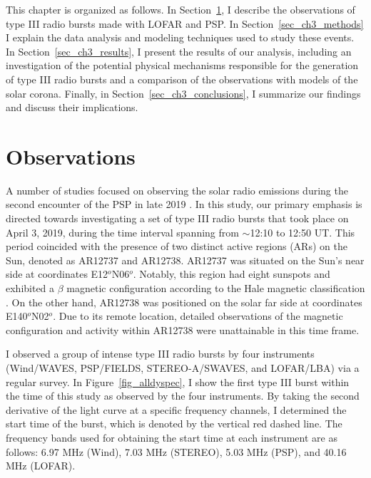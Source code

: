 This chapter is organized as follows. In Section~\ref{sec_ch3_obs}, I describe the observations of type III radio bursts made with LOFAR and PSP. In Section~\ref{sec_ch3_methods} I explain the data analysis and modeling techniques used to study these events. In Section~\ref{sec_ch3_results}, I present the results of our analysis, including an investigation of the potential physical mechanisms responsible for the generation of type III radio bursts and a comparison of the observations with models of the solar corona. Finally, in Section~\ref{sec_ch3_conclusions}, I summarize our findings and discuss their implications.

\section{Observations}
\label{sec_ch3_obs}
A number of studies focused on observing the solar radio emissions during the second encounter of the PSP in late 2019 \cite{krupar_2020, pulupa_2020, cattell_2021, harra_2021, badman_2022}. In this study, our primary emphasis is directed towards investigating a set of type III radio bursts that took place on April 3, 2019, during the time interval spanning from $\sim$12:10 to 12:50 UT. This period coincided with the presence of two distinct active regions (ARs) on the Sun, denoted as AR12737 and AR12738. 
AR12737 was situated on the Sun's near side at coordinates E12$^o$N06$^o$. Notably, this region had eight sunspots and exhibited a $\beta$ magnetic configuration according to the Hale magnetic classification \cite{hale_2019}. On the other hand, AR12738 was positioned on the solar far side at coordinates E140$^o$N02$^o$. Due to its remote location, detailed observations of the magnetic configuration and activity within AR12738 were unattainable in this time frame.

I observed a group of intense type III radio bursts by four instruments (Wind/WAVES, PSP/FIELDS, STEREO-A/SWAVES, and LOFAR/LBA) via a regular survey. In Figure~\ref{fig_alldyspec}, I show the first type III burst within the time of this study as observed by the four instruments. By taking the second derivative of the light curve at a specific frequency channels, I determined the start time of the burst, which is denoted by the vertical red dashed line. The frequency bands used for obtaining the start time at each instrument are as follows: 6.97 MHz (Wind), 7.03 MHz (STEREO), 5.03 MHz (PSP), and 40.16 MHz (LOFAR).

